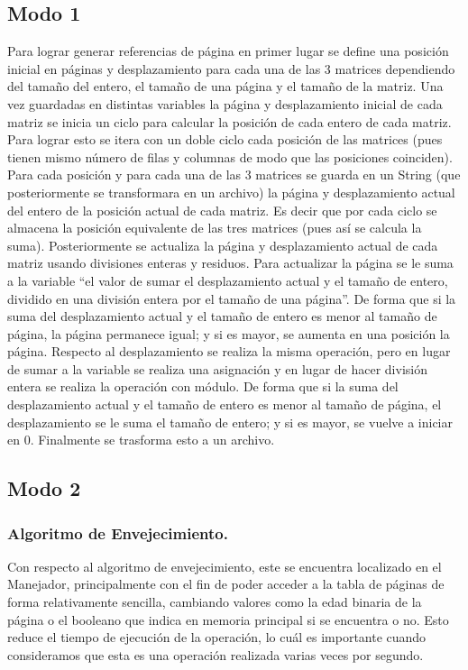 \documentclass[a4paper]{article}
\begin{document}
\subsection{Modo 1}
Para lograr generar referencias de página en primer lugar se define una
posición inicial en páginas y desplazamiento para cada una de las 3 
matrices dependiendo del tamaño del entero, el tamaño de una página y 
el tamaño de la matriz. Una vez guardadas en distintas variables la 
página y desplazamiento inicial de cada matriz se inicia un ciclo para 
calcular la posición de cada entero de cada matriz. Para lograr esto 
se itera con un doble ciclo cada posición de las matrices (pues 
tienen mismo número de filas y columnas de modo que las posiciones 
coinciden). Para cada posición y para cada una de las 3 matrices se 
guarda en un String (que posteriormente se transformara en un archivo) 
la página y desplazamiento actual del entero de la posición actual de 
cada matriz. Es decir que por cada ciclo se almacena la posición 
equivalente de las tres matrices (pues así se calcula la suma). 
Posteriormente se actualiza la página y desplazamiento actual de cada 
matriz usando divisiones enteras y residuos. Para actualizar la página 
se le suma a la variable “el valor de sumar el desplazamiento actual y 
el tamaño de entero, dividido en una división entera por el tamaño de 
una página”. De forma que si la suma del desplazamiento actual y el 
tamaño de entero es menor al tamaño de página, la página permanece 
igual; y si es mayor, se aumenta en una posición la página. Respecto al 
desplazamiento se realiza la misma operación, pero en lugar de sumar a 
la variable se realiza una asignación y en lugar de hacer división 
entera se realiza la operación con módulo. De forma que si la suma del 
desplazamiento actual y el tamaño de entero es menor al tamaño de 
página, el desplazamiento se le suma el tamaño de entero; y si es 
mayor, se vuelve a iniciar en 0. Finalmente se trasforma esto a un 
archivo.

\subsection{Modo 2}
\subsubsection{Algoritmo de Envejecimiento.}
Con respecto al algoritmo de envejecimiento, este se encuentra localizado
en el Manejador, principalmente con el fin de poder acceder a la tabla de 
páginas de forma relativamente sencilla, cambiando valores como la edad binaria
de la página o el booleano que indica en memoria principal si se encuentra
o no. Esto reduce el tiempo de ejecución de la operación, lo cuál es importante
cuando consideramos que esta es una operación realizada varias veces por segundo.
\end{document}
